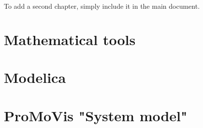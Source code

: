To add a second chapter, simply include it in the main document.

\section{Mathematical tools}

\section{Modelica}
\section{ProMoVis "System model"}



